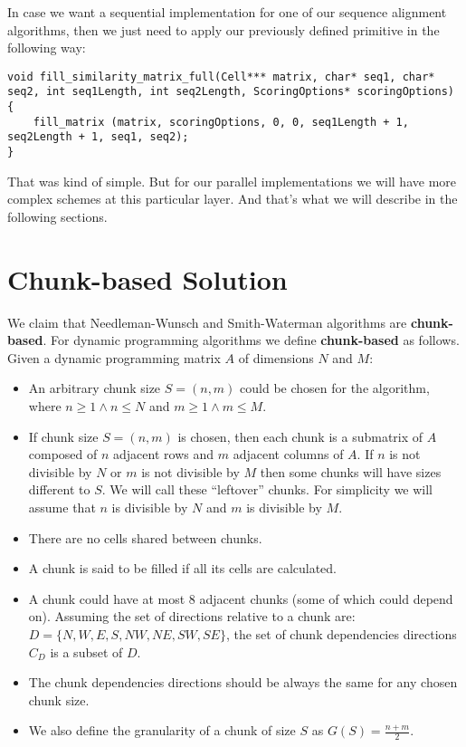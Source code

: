 \documentclass[journal]{IEEEtran}
\begin{document}
In case we want a sequential implementation for one of our  sequence alignment algorithms, then we just need to apply our previously defined primitive in the following way:

\lstset{language=C}
\begin{lstlisting}[linewidth=\columnwidth,breaklines=true]
void fill_similarity_matrix_full(Cell*** matrix, char* seq1, char* seq2, int seq1Length, int seq2Length, ScoringOptions* scoringOptions) 
{
    fill_matrix (matrix, scoringOptions, 0, 0, seq1Length + 1, seq2Length + 1, seq1, seq2);
}
\end{lstlisting}

That was kind of simple. But for our parallel implementations we will have more complex schemes at this particular layer. And that's what we will describe in the following sections.

\section{Chunk-based Solution}

We claim that Needleman-Wunsch and Smith-Waterman algorithms are \textbf{chunk-based}. For dynamic programming algorithms we define \textbf{chunk-based} as follows. Given a dynamic programming matrix $A$ of dimensions $N$ and $M$:

\begin{itemize}
    \item An arbitrary chunk size $S = (n, m)$ could be chosen for the algorithm, where $n \geq 1 \land n \leq N$ and $m \geq 1 \land m \leq M$.
    \item If chunk size $S = (n, m)$ is chosen, then each chunk is a submatrix of $A$ composed of $n$ adjacent rows and $m$ adjacent columns of $A$. If $n$ is not divisible by $N$ or $m$ is not divisible by $M$ then some chunks will have sizes different to $S$. We will call these ``leftover'' chunks. For simplicity we will assume that $n$ is divisible by $N$ and $m$ is divisible by $M$.
    \item There are no cells shared between chunks.
    \item A chunk is said to be filled if all its cells are calculated.
    \item A chunk could have at most 8 adjacent chunks (some of which could depend on). Assuming the set of directions relative to a chunk are: $D = \{ N, W, E, S, NW, NE, SW, SE \}$, the set of chunk dependencies directions $C_D$ is a subset of $D$.
    \item The chunk dependencies directions should be always the same for any chosen chunk size.
    \item We also define the granularity of a chunk of size $S$ as $G(S) = \frac{n+m}{2}$.
\end{itemize}
\end{document}
